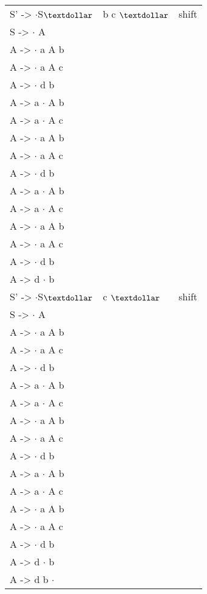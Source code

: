 \begin{latin}
\begin{tabular}{ | m{5cm} | m{5cm} | m{5cm} |  } \hline
S' -> {$\cdot$}S{$\textdollar$} & b c {$\textdollar$} & shift  \\ 
S -> {$\cdot$} A & & \\ 
A -> {$\cdot$} a A b & & \\
A -> {$\cdot$} a A c & & \\
A -> {$\cdot$} d b & & \\
A -> a {$\cdot$} A b & &\\ 
A -> a {$\cdot$} A c & & \\ 
A -> {$\cdot$} a A b & & \\
A -> {$\cdot$} a A c & & \\
A -> {$\cdot$} d b & & \\
A -> a {$\cdot$} A b & &  \\ 
A -> a {$\cdot$} A c & & \\ 
A -> {$\cdot$} a A b & & \\
A -> {$\cdot$} a A c & & \\
A -> {$\cdot$} d b & & \\
A -> d {$\cdot$} b & & \\\hline

S' -> {$\cdot$}S{$\textdollar$} & c {$\textdollar$} & shift  \\ 
S -> {$\cdot$} A & & \\ 
A -> {$\cdot$} a A b & & \\
A -> {$\cdot$} a A c & & \\
A -> {$\cdot$} d b & & \\
A -> a {$\cdot$} A b & &\\ 
A -> a {$\cdot$} A c & & \\ 
A -> {$\cdot$} a A b & & \\
A -> {$\cdot$} a A c & & \\
A -> {$\cdot$} d b & & \\
A -> a {$\cdot$} A b & &  \\ 
A -> a {$\cdot$} A c & & \\ 
A -> {$\cdot$} a A b & & \\
A -> {$\cdot$} a A c & & \\
A -> {$\cdot$} d b & & \\
A -> d {$\cdot$} b & & \\
A -> d b {$\cdot$} & & \\ \hline
\end{tabular}
\end{latin}


